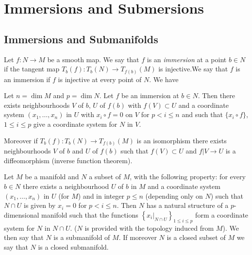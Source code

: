 \chapter{Immersions and Submersions}\label{chap7}

\section*{Immersions and Submanifolds}

Let $f:N\to M$ be a smooth map. We say that $f$ is an {\em immersion} at a point $b\in N$ if the tangent map $T_{b}(f):T_{b}(N)\to T_{f(b)}(M)$ is injective.\pageoriginale We say that $f$ is an immersion if $f$ is injective at every point of $N$. We have

\begin{theorem}\label{chap7-thm7.1}
Let $n=\dim M$ and $p=\dim N$. Let $f$ be an immersion at $b\in N$. Then there exists neighbourhoods $V$ of $b$, $U$ of $f(b)$ with $f(V)\subset U$ and a coordinate system $(x_{1},\ldots,x_{n})$ in $U$ with $x_{i}\circ f=0$ on $V$ for $p<i\leq n$ and such that $\{x_{i}\circ f\}$, $1\leq i\leq p$ give a coordinate system for $N$ in $V$.
\end{theorem}

Moreover if $T_{b}(f):T_{b}(N)\to T_{f(b)}(M)$ is an isomorphism there exists neighbourhoods $V$ of $b$ and $U$ of $f(b)$ such that $f(V)\subset U$ and $f|V\to U$ is a diffeomorphism (inverse function theorem).

Let $M$ be a manifold and $N$ a subset of $M$, with the following property: for every $b\in N$ there exists a neighbourhood $U$ of $b$ in $M$ and a coordinate system $(x_{1},\ldots,x_{n})$ in $U$ (for $M$) and in integer $p\leq n$ (depending only on $N$) such that $N\cap U$ is given by $x_{i}=0$ for $p<i\leq n$. Then $N$ has a natural structure of a $p$-dimensional manifold such that the functions $\left\{x_{i}|_{N\cap U}\right\}_{1\leq i\leq p}$ form a coordinate system for $N$ in $N\cap U$. ($N$ is provided with the topology induced from $M$). We then say that $N$ is a submanifold of $M$. If moreover $N$ is a closed subset of $M$ we say that $N$ is a closed submanifold.

